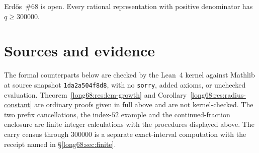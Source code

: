 \documentclass[11pt]{article}
\renewcommand{\commitshort}{1da2a504f8d8}
\begin{document}
\medskip
\noindent Erd\H{o}s~\#68 is open.  Every rational representation with
positive denominator has $q\ge300000$.

\section*{Sources and evidence}

The formal counterparts below are checked by the Lean~4 kernel against
Mathlib at source snapshot \texttt{\commitshort}, with no \texttt{sorry},
added axioms, or unchecked evaluation.  Theorem~\ref{long68:res:lcm-growth} and
Corollary~\ref{long68:res:radius-constant} are ordinary proofs given in full above
and are not kernel-checked.  The two prefix cancellations, the index-$52$
example and the continued-fraction enclosure are finite integer calculations
with the procedures displayed above.  The carry census through $300000$ is a
separate exact-interval computation with the receipt named in
\S\ref{long68:sec:finite}.
\end{document}
